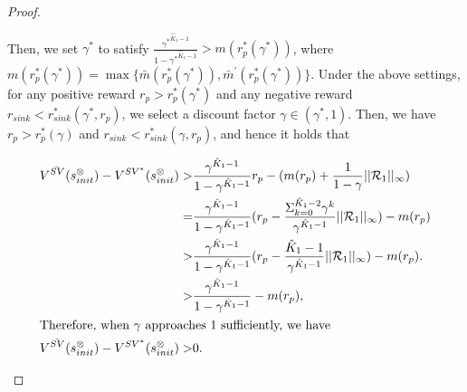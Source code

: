 \documentclass[10pt]{article}
\theoremstyle{definition}
\begin{document}
\begin{proof}
\begin{enumerate}
 Then, we set $\gamma^{\ast}$ to satisfy $ \frac{ {\gamma^{\ast}}^{\hat{K}_1 -1} }{1 - {\gamma^{\ast}}^{\hat{K}_1 -1}} > m(r^{\ast}_p(\gamma^{\ast}))$, where $m(r^{\ast}_p(\gamma^{\ast})) = \max \{ \bar{m}(r^{\ast}_p(\gamma^{\ast})), \bar{m}^{\prime}(r^{\ast}_p(\gamma^{\ast})) \}$.
Under the above settings, for any positive reward $r_p > r^{\ast}_p(\gamma^{\ast})$ and any negative reward $r_{sink} < r^{\ast}_{sink}(\gamma^{\ast}, r_p)$, we select a discount factor $\gamma \in (\gamma^{\ast}, 1)$. Then, we have $r_p > r^{\ast}_p(\gamma) $ and $r_{sink} < r^{\ast}_{sink}(\gamma, r_p)$, and hence it holds that

\begin{align}
  V^{\bar{SV}}(s^{\otimes}_{init}) - V^{SV^{\ast}}(s^{\otimes}_{init})
   > & \frac{ \gamma^{\hat{K}_1 - 1}}{ 1 - \gamma^{\hat{K}_1 - 1}} r_p - ( m(r_p) + \frac{1}{1-\gamma} ||\mathcal{R}_1||_{\infty} ) \nonumber \\
   = & \frac{ \gamma^{\hat{K}_1 - 1}}{ 1 - \gamma^{\hat{K}_1 - 1}} (r_p - \frac{ \Sigma_{k=0}^{\hat{K}_1 -2} {\gamma}^k }{ {\gamma}^{\hat{K}_1 -1} } ||\mathcal{R}_1||_{\infty} ) - m(r_p) \nonumber \\
   > & \frac{ \gamma^{\hat{K}_1 - 1}}{ 1 - \gamma^{\hat{K}_1 - 1}} (r_p - \frac{ \hat{K}_1 -1 }{ {\gamma}^{\hat{K}_1 -1} } ||\mathcal{R}_1||_{\infty} ) - m(r_p). \nonumber \\
   > & \frac{ \gamma^{\hat{K}_1 - 1}}{ 1 - \gamma^{\hat{K}_1 - 1}} - m(r_p), \nonumber \\
\intertext{Therefore, when $\gamma$ approaches 1 sufficiently, we have }
  V^{\bar{SV}}(s^{\otimes}_{init}) - V^{SV^{\ast}}(s^{\otimes}_{init}) > & 0.
\end{align}


\begin{comment}
  Therefore, for any positive value $r_p > r^{\ast}_p(\gamma^{\ast})$, and negative value $r_{sink} < r^{\ast}_{sink}(\gamma^{\ast}, r_p)$, there exists a discount factor $\gamma \in (\gamma^{\ast}, 1)$ that implies $V^{\bar{SV}}(s^{\otimes}_{init}) > V^{SV^{\ast}}(s^{\otimes}_{init})$. This is because by the setting of $r^{\ast}_{sink}$, we have

  \begin{align}
    V^{\bar{SV}}(s^{\otimes}_{init}) - V^{SV^{\ast}}(s^{\otimes}_{init})
     > & \frac{ \gamma^{\hat{K}_1 - 1}}{ 1 - \gamma^{\hat{K}_1 - 1}} r_p - ( m(r_p) + \frac{1}{1-\gamma} ||\mathcal{R}_1||_{\infty} ) \nonumber \\
     = & \frac{ \gamma^{\hat{K}_1 - 1}}{ 1 - \gamma^{\hat{K}_1 - 1}} (r_p - \frac{ \Sigma_{k=0}^{\hat{K}_1 -2} {\gamma}^k ||\mathcal{R}_1||_{\infty} }{ {\gamma}^{\hat{K}_1 -1} } ||\mathcal{R}_1||_{\infty} ) - m(r_p), \nonumber \\
     > & \frac{ \gamma^{\hat{K}_1 - 1}}{ 1 - \gamma^{\hat{K}_1 - 1}} (r_p - \frac{ \hat{K}_1 -1 }{ {\gamma}^{\hat{K}_1 -1} } ||\mathcal{R}_1||_{\infty} ) - m(r_p), \nonumber
  \intertext{by the settings of $\gamma^{\ast}$ and $r^{\ast}_p$, we have}
    V^{\bar{SV}}(s^{\otimes}_{init}) - V^{SV^{\ast}}(s^{\otimes}_{init}) > & 0.
  \end{align}
\end{comment}


\end{enumerate}
\end{proof}
\end{document}
